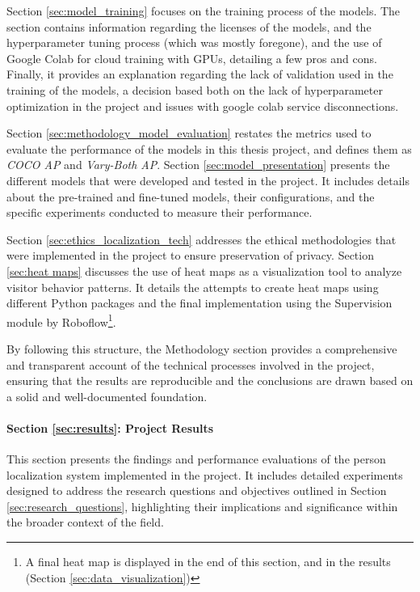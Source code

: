 Section \ref{sec:model_training} focuses on the training process of the models. The section contains information regarding the licenses of the models, and the hyperparameter tuning process (which was mostly foregone), and the use of Google Colab for cloud training with GPUs, detailing a few pros and cons. Finally, it provides an explanation regarding the lack of validation used in the training of the models, a decision based both on the lack of hyperparameter optimization in the project and issues with google colab service disconnections. 

Section \ref{sec:methodology_model_evaluation} restates the metrics used to evaluate the performance of the models in this thesis project, and defines them as \textit{COCO AP} and \textit{Vary-Both AP}. Section \ref{sec:model_presentation} presents the different models that were developed and tested in the project. It includes details about the pre-trained and fine-tuned models, their configurations, and the specific experiments conducted to measure their performance.

Section \ref{sec:ethics_localization_tech} addresses the ethical methodologies that were implemented in the project to ensure preservation of privacy. Section \ref{sec:heat maps} discusses the use of heat maps as a visualization tool to analyze visitor behavior patterns. It details the attempts to create heat maps using different Python packages and the final implementation using the Supervision module by Roboflow\footnote{A final heat map is displayed in the end of this section, and in the results (Section \ref{sec:data_visualization})}.

By following this structure, the Methodology section provides a comprehensive and transparent account of the technical processes involved in the project, ensuring that the results are reproducible and the conclusions are drawn based on a solid and well-documented foundation. 

\newpage
\paragraph{Section \ref{sec:results}: Project Results} 
This section presents the findings and performance evaluations of the person localization system implemented in the project. It includes detailed experiments designed to address the research questions and objectives outlined in Section \ref{sec:research_questions}, highlighting their implications and significance within the broader context of the field.

